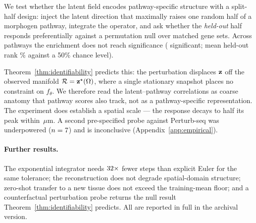 We test whether the latent field encodes pathway-specific structure with a
split-half design: inject the latent direction that maximally raises one random
half of a morphogen pathway, integrate the operator, and ask whether the
\emph{held-out} half responds preferentially against a permutation null over
matched gene sets. Across \BeadNPathways{} pathways the enrichment does not reach
significance (\BeadNSig{} significant; mean held-out rank \BeadMeanRank\% against
a 50\% chance level).

Theorem~\ref{thm:identifiability} predicts this: the perturbation displaces
$\mathbf{z}$ off the observed manifold $\mathcal{R} = \mathbf{z}^\star(\Omega)$, where a single
stationary snapshot places no constraint on $f_\theta$. We therefore read the
latent--pathway correlations as coarse anatomy that pathway scores also track,
not as a pathway-specific representation. The experiment does establish a spatial
scale --- the response decays to half its peak within \BeadWidth\,$\mu$m. A
second pre-specified probe against Perturb-seq \citep{norman2019perturbseq} was
underpowered ($n = 7$) and is inconclusive
(Appendix~\ref{app:empirical}).
\else
\paragraph{Further results.} The exponential integrator needs
$32\times$ fewer steps than explicit Euler for the same tolerance; the
reconstruction does not degrade spatial-domain structure; zero-shot transfer to a
new tissue does not exceed the training-mean floor; and a counterfactual
perturbation probe returns the null result Theorem~\ref{thm:identifiability}
predicts. All are reported in full in the archival version.
\fi
